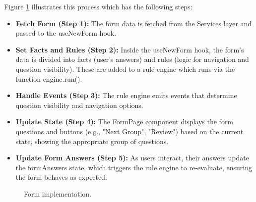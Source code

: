 Figure \ref{fig:form_implementation} illustrates this process which has the following steps:

\begin{itemize}
	\item \textbf{Fetch Form (Step 1):} The form data is fetched from the Services layer and passed to the useNewForm hook.
	\item \textbf{Set Facts and Rules (Step 2):} Inside the useNewForm hook, the form’s data is divided into facts (user's answers) and rules (logic for navigation and question visibility). These are added to a rule engine which runs via the function engine.run().
	\item \textbf{Handle Events (Step 3):} The rule engine emits events that determine question visibility and navigation options.
	\item \textbf{Update State (Step 4):} The FormPage component displays the form questions and buttons (e.g., "Next Group", "Review") based on the current state, showing the appropriate group of questions.
	\item \textbf{Update Form Answers (Step 5):} As users interact, their answers update the formAnswers state, which triggers the rule engine to re-evaluate, ensuring the form behaves as expected.
\end{itemize}

\begin{figure}[h]
	\begin{center}
	\end{center}
	\caption{Form implementation.}\label{fig:form_implementation}
\end{figure}

